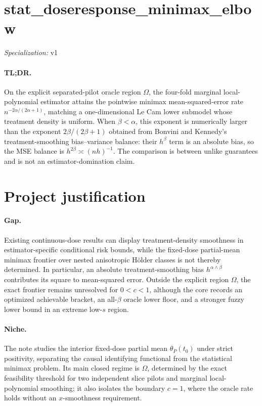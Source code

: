 \documentclass{article}
\begin{document}
\sloppy

\section*{stat\_\allowbreak{}doseresponse\_\allowbreak{}minimax\_\allowbreak{}elbow}

\noindent\textit{Specialization:} v1\par

\paragraph{TL;DR.} On the explicit separated-pilot oracle region \(\Omega\), the four-fold marginal local-polynomial estimator attains the pointwise minimax mean-squared-error rate \(n^{-2\alpha/(2\alpha+1)}\), matching a one-dimensional Le Cam lower submodel whose treatment density is uniform. When \(\beta<\alpha\), this exponent is numerically larger than the exponent \(2\beta/(2\beta+1)\) obtained from Bonvini and Kennedy's treatment-smoothing bias--variance balance: their \(h^\beta\) term is an absolute bias, so the MSE balance is \(h^{2\beta}\asymp(nh)^{-1}\). The comparison is between unlike guarantees and is not an estimator-domination claim.

\section{Project justification}

\paragraph{Gap.} Existing continuous-dose results can display treatment-density smoothness in estimator-specific conditional risk bounds, while the fixed-dose partial-mean minimax frontier over nested anisotropic H\"older classes is not thereby determined. In particular, an absolute treatment-smoothing bias \(h^{\alpha\wedge\beta}\) contributes its square to mean-squared error. Outside the explicit region \(\Omega\), the exact frontier remains unresolved for \(0<c<1\), although the core records an optimized achievable bracket, an all-\(\beta\) oracle lower floor, and a stronger fuzzy lower bound in an extreme low-\(s\) region.

\paragraph{Niche.} The note studies the interior fixed-dose partial mean \(\theta_P(t_0)\) under strict positivity, separating the causal identifying functional from the statistical minimax problem. Its main closed regime is \(\Omega\), determined by the exact feasibility threshold for two independent slice pilots and marginal local-polynomial smoothing; it also isolates the boundary \(c=1\), where the oracle rate holds without an \(x\)-smoothness requirement.
\end{document}
